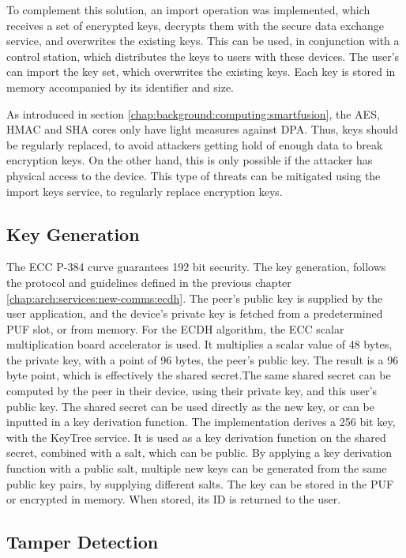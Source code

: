 To complement this solution, an import operation was implemented, which receives a set of encrypted keys, decrypts them with the secure data exchange service, and overwrites the existing keys. This can be used, in conjunction with a control station, which distributes the keys to users with these devices. The user's can import the key set, which overwrites the existing keys.
Each key is stored in memory accompanied by its identifier and size.

As introduced in section \ref{chap:background:computing:smartfusion}, the AES, HMAC and SHA cores only have light measures against \ac{DPA}. Thus, keys should be regularly replaced, to avoid attackers getting hold of enough data to break encryption keys. On the other hand, this is only possible if the attacker has physical access to the device. 
This type of threats can be mitigated using the import keys service, to regularly replace encryption keys.

\subsection{Key Generation}\label{chap:implementation:services:key-generation}

The \ac{ECC} P-384 curve guarantees 192 bit security.
The key generation, follows the protocol and guidelines defined in the previous chapter \ref{chap:arch:services:new-comms:ecdh}.
The peer's public key is supplied by the user application, and the device's private key is fetched from a predetermined PUF slot, or from memory.
For the ECDH algorithm, the ECC scalar multiplication board accelerator is used. It multiplies a scalar value of 48 bytes, the private key, with a point of 96 bytes, the peer's public key. The result is a 96 byte point, which is effectively the shared secret.The same shared secret can be computed by the peer in their device, using their private key, and this user's public key.
The shared secret can be used directly as the new key, or can be inputted in a key derivation function.
The implementation derives a 256 bit key, with the KeyTree service. It is used as a key derivation function on the shared secret, combined with a salt, which can be public.
By applying a key derivation function with a public salt, multiple new keys can be generated from the same public key pairs, by supplying different salts. 
The key can be stored in the PUF or encrypted in memory. When stored, its ID is returned to the user.

\subsection{Tamper Detection}\label{chap:implementation:services:tamper-detection}

